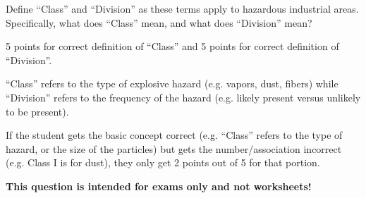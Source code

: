 

Define ``Class'' and ``Division'' as these terms apply to hazardous industrial areas.  Specifically, what does ``Class'' mean, and what does ``Division'' mean?







5 points for correct definition of ``Class'' and 5 points for correct definition of ``Division''.

\vskip 10pt

``Class'' refers to the type of explosive hazard (e.g. vapors, dust, fibers) while ``Division'' refers to the frequency of the hazard (e.g. likely present versus unlikely to be present).  

\vskip 10pt

If the student gets the basic concept correct (e.g. ``Class'' refers to the type of hazard, or the size of the particles) but gets the number/association incorrect (e.g. Class I is for dust), they only get 2 points out of 5 for that portion.







{\bf This question is intended for exams only and not worksheets!}



